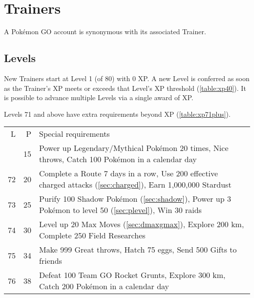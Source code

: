 \chapter{Trainers}
A Pokémon GO account is synonymous with its associated Trainer.

\section{Levels\label{sec:levels}}
New Trainers start at Level 1 (of 80) with 0 XP\@.
A new Level is conferred as soon as the Trainer's XP meets or exceeds
  that Level's XP threshold (\autoref{table:xp40}).
It is possible to advance multiple Levels via a single award of XP\@.

Levels 71 and above have extra requirements beyond XP (\autoref{table:xp71plus}).
\begin{table}
\centering
\begin{tabular}{rrp{}}
  L & P & Special requirements \\
\Midrule
  71 & 15 & Power up Legendary/Mythical Pokémon 20 times,\newline
  999 Nice throws,\newline
  Catch 100 Pokémon in a calendar day\\
\rowcolor{Gray!25}
  72 & 20 & Complete a Route 7 days in a row,\newline
  Use 200 effective charged attacks (\autoref{sec:charged}),\newline
  Earn 1,000,000 Stardust\\
  73 & 25 & Purify 100 Shadow Pokémon (\autoref{sec:shadow}),\newline
  Power up 3 Pokémon to level 50 (\autoref{sec:plevel}),\newline
  Win 30 raids\\
\rowcolor{Gray!25}
  74 & 30 & Level up 20 Max Moves (\autoref{sec:dmaxgmax}),\newline
  Explore 200 km,\newline
  Complete 250 Field Researches\\
  75 & 34 & Make 999 Great throws,\newline
  Hatch 75 eggs,\newline
  Send 500 Gifts to friends\\
\rowcolor{Gray!25}
  76 & 38 & Defeat 100 Team GO Rocket Grunts,\newline
  Explore 300 km,\newline
  Catch 200 Pokémon in a calendar day\\

\end{tabular}
\end{table}
